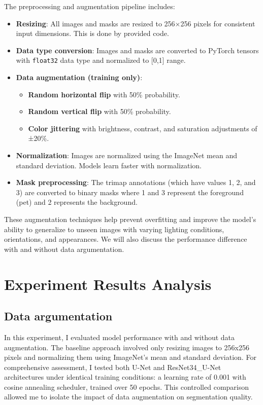 \documentclass[twocolumn,a4paper]{article}
\begin{document}
The preprocessing and augmentation pipeline includes:
\begin{itemize}
    \item \textbf{Resizing}: All images and masks are resized to 256×256 pixels for consistent input dimensions. This is done by provided code.
    \item \textbf{Data type conversion}: Images and masks are converted to PyTorch tensors with \texttt{float32} data type and normalized to [0,1] range.
    \item \textbf{Data augmentation (training only)}:
    \begin{itemize}
        \item \textbf{Random horizontal flip} with 50\% probability.
        \item \textbf{Random vertical flip} with 50\% probability.
        \item \textbf{Color jittering} with brightness, contrast, and saturation adjustments of ±20\%.
    \end{itemize}
    \item \textbf{Normalization}: Images are normalized using the ImageNet mean and standard deviation. Models learn faster with normalization.
    \item \textbf{Mask preprocessing}: The trimap annotations (which have values 1, 2, and 3) are converted to binary masks where 1 and 3 represent the foreground (pet) and 2 represents the background.
\end{itemize}

These augmentation techniques help prevent overfitting and improve the model's ability to generalize to unseen images with varying lighting conditions, orientations, and appearances. We will also discuss the performance difference with and without data argumentation.

\section{Experiment Results Analysis} \label{sec:exp}
\subsection{Data argumentation}

In this experiment, I evaluated model performance with and without data augmentation. The baseline approach involved only resizing images to 256x256 pixels and normalizing them using ImageNet's mean and standard deviation. For comprehensive assessment, I tested both U-Net and ResNet34\_U-Net architectures under identical training conditions: a learning rate of 0.001 with cosine annealing scheduler, trained over 50 epochs. This controlled comparison allowed me to isolate the impact of data augmentation on segmentation quality.
\end{document}
